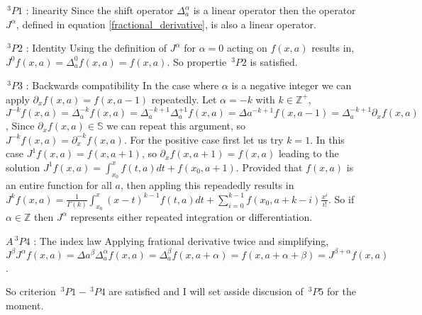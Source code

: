 \documentclass[%
 onecolumn,
 amsmath, amssymb, aps, pra, 10pt
]{revtex4-2}
\begin{document}
$\,^3P1$ : linearity
Since the shift operator $\Delta_{a}^{\alpha}$ is a linear operator then the operator $J^{\alpha}$, defined in equation \eqref{fractional_derivative}, is also a linear operator.



$\,^3P2$ : Identity
Using the definition of $J^{\alpha}$ for $\alpha=0$ acting on $f(x, a)$ results in, $J^{0}f(x, a) = \Delta_{a}^{0}f(x, a) = f(x, a)$. So propertie $\,^3P2$ is satisfied.



$\,^3P3$ : Backwards compatibility
In the case where $\alpha$ is a negative integer we can apply $\partial_x f(x, a) = f(x, a - 1)$ repeatedly. Let $\alpha = -k$ with $k \in \mathbb{Z}^+$, $J^{-k} f(x, a) = \Delta_{a}^{-k} f(x, a)=\Delta_{a}^{-k + 1}\Delta_{a}^{+1} f(x, a) = \Delta{a}^{-k + 1}f(x, a - 1) = \Delta_{a}^{-k + 1}\partial_x f(x, a)$, Since $\partial_x f(x, a) \in \mathbb{S}$ we can repeat this argument, so $J^{-k} f(x, a) = \partial_{x}^{-k} f(x, a)$. For the positive case first let us try $k=1$. In this case $J^{1} f(x, a) = f(x, a + 1)$, so $\partial_x f(x, a + 1) = f(x, a)$ leading to the solution $J^{1} f(x, a) = \int_{x_0}^{x} f(t, a)dt + f(x_0, a + 1)$. Provided that $f(x, a)$ is an entire function for all $a$, then appling this repeadedly results in $J^{k} f(x, a) = \frac{1}{\Gamma(k)}\int_{x_0}^{x} (x - t)^{k - 1}f(t, a)dt + \sum_{i = 0}^{k - 1}f(x_0, a + k - i)\frac{x^i}{i!}$. So if $\alpha \in \mathbb{Z}$ then $J^{\alpha}$ represents either repeated integration or differentiation.



$A\,^3P4$ : The index law
Applying frational derivative twice and simplifying, $J^{\beta}J^{\alpha} f(x, a) = \Delta{a}^{\beta}\Delta_{a}^{\alpha} f(x, a) = \Delta_{a}^{\beta} f(x, a + \alpha) = f(x, a + \alpha + \beta) = J^{\beta + \alpha} f(x, a)$.



So criterion $\,^3P1 - \,^3P4$ are satisfied and I will set asside discusion of $\,^3P5$ for the moment.
\end{document}
